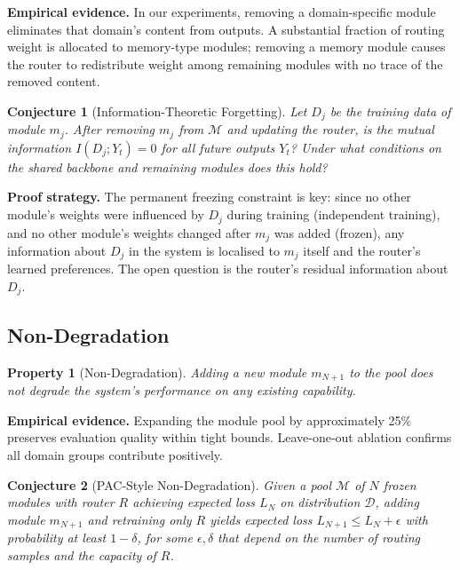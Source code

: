 \documentclass[11pt,a4paper]{article}
\newtheorem{property}{Property}
\newtheorem{conjecture}{Conjecture}
\begin{document}
\noindent\textbf{Empirical evidence.} In our experiments, removing a domain-specific module eliminates that domain's content from outputs. A substantial fraction of routing weight is allocated to memory-type modules; removing a memory module causes the router to redistribute weight among remaining modules with no trace of the removed content.

\begin{conjecture}[Information-Theoretic Forgetting]
Let $D_j$ be the training data of module $m_j$. After removing $m_j$ from $\mathcal{M}$ and updating the router, is the mutual information $I(D_j; Y_t) = 0$ for all future outputs $Y_t$? Under what conditions on the shared backbone and remaining modules does this hold?
\end{conjecture}

\noindent\textbf{Proof strategy.} The permanent freezing constraint is key: since no other module's weights were influenced by $D_j$ during training (independent training), and no other module's weights changed after $m_j$ was added (frozen), any information about $D_j$ in the system is localised to $m_j$ itself and the router's learned preferences. The open question is the router's residual information about $D_j$.

\subsection{Non-Degradation}
\label{sec:nondeg}

\begin{property}[Non-Degradation]
Adding a new module $m_{N+1}$ to the pool does not degrade the system's performance on any existing capability.
\end{property}

\noindent\textbf{Empirical evidence.} Expanding the module pool by approximately 25\% preserves evaluation quality within tight bounds. Leave-one-out ablation confirms all domain groups contribute positively.

\begin{conjecture}[PAC-Style Non-Degradation]
Given a pool $\mathcal{M}$ of $N$ frozen modules with router $R$ achieving expected loss $L_N$ on distribution $\mathcal{D}$, adding module $m_{N+1}$ and retraining only $R$ yields expected loss $L_{N+1} \leq L_N + \epsilon$ with probability at least $1 - \delta$, for some $\epsilon, \delta$ that depend on the number of routing samples and the capacity of $R$.
\end{conjecture}
\end{document}
